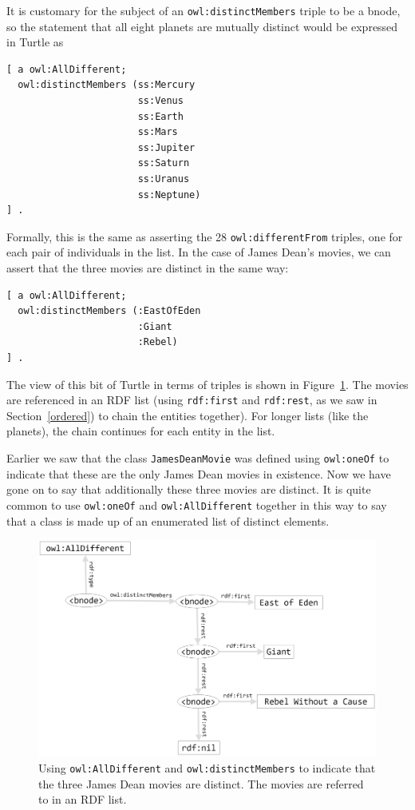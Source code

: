 It is customary for the subject of an \texttt{owl:distinctMembers} triple to be a
bnode, so the
statement that all eight planets are mutually distinct would be
expressed in Turtle as

\begin{lstlisting}
[ a owl:AllDifferent;
  owl:distinctMembers (ss:Mercury
                       ss:Venus
                       ss:Earth
                       ss:Mars
                       ss:Jupiter
                       ss:Saturn
                       ss:Uranus
                       ss:Neptune)
] .
\end{lstlisting}

Formally, this is the same as asserting the 28 \texttt{owl:differentFrom}
triples, one for each pair of individuals in the list. In the case of
James Dean's movies, we can assert that the three movies are distinct in
the same way:

\begin{lstlisting}
[ a owl:AllDifferent;
  owl:distinctMembers (:EastOfEden
                       :Giant
                       :Rebel)
] .
\end{lstlisting}

The view of this bit of Turtle in terms of triples is shown in Figure~\ref{fig:ch13.02}.
The movies are referenced in an RDF list (using \texttt{rdf:first} and \texttt{rdf:rest}, as 
we saw in Section~\ref{ordered})
to chain the entities together). For longer lists (like the planets),
the chain continues for each entity in the list.

Earlier we saw that the class \texttt{JamesDeanMovie} was defined using \texttt{owl:oneOf}
to indicate that these are the only James Dean movies in existence. Now
we have gone on to say that additionally these three movies are
distinct. It is quite common to use \texttt{owl:oneOf} and \texttt{owl:AllDifferent}
together in this way to say that a class is made up of an enumerated
list of distinct elements.


\begin{figure}
\centering
\includegraphics[width=5in]{SWWOv3/media/ch13/figure13-2.png}
\caption{Using \texttt{owl:AllDifferent} and \texttt{owl:distinctMembers} to indicate that the
three James Dean movies are distinct. The movies are referred to in an
RDF list.
}
\label{fig:ch13.02}
\end{figure}


